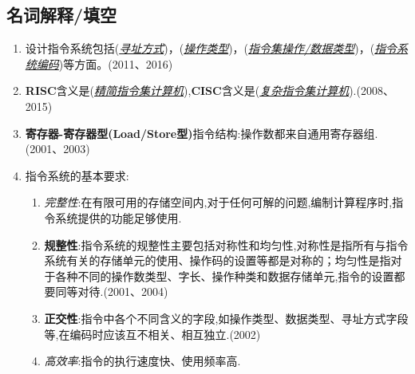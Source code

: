 \documentclass[a4paper]{ctexart}
\newcommand{\blank}[1]{(\emph{\underline{#1}})}
\begin{document}
\subsection{名词解释/填空}
\begin{enumerate}
  \item 设计指令系统包括\blank{寻址方式}，\blank{操作类型}，\blank{指令集操作/数据类型}，\blank{指令系统编码}等方面。(2011、2016)
  \item \textbf{RISC}含义是\blank{精简指令集计算机},\textbf{CISC}含义是\blank{复杂指令集计算机}.(2008、2015)
  \item \textbf{寄存器-寄存器型(Load/Store型)}指令结构:操作数都来自通用寄存器组.(2001、2003)
  \item 指令系统的基本要求:
  \begin{enumerate}
    \item \emph{完整性}:在有限可用的存储空间内,对于任何可解的问题,编制计算程序时,指令系统提供的功能足够使用.
    \item \textbf{规整性}:指令系统的规整性主要包括对称性和均匀性,对称性是指所有与指令系统有关的存储单元的使用、操作码的设置等都是对称的；均匀性是指对于各种不同的操作数类型、字长、操作种类和数据存储单元,指令的设置都要同等对待.(2001、2004)
    \item \textbf{正交性}:指令中各个不同含义的字段,如操作类型、数据类型、寻址方式字段等,在编码时应该互不相关、相互独立.(2002)
    \item \emph{高效率}:指令的执行速度快、使用频率高.
  \end{enumerate}
\end{enumerate}
\end{document}
